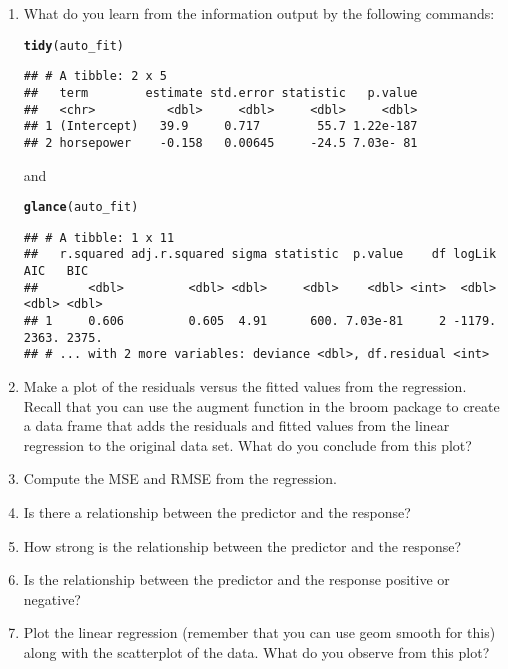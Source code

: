 \documentclass[12pt]{article}\usepackage[]{graphicx}\usepackage[]{color}
\makeatletter
\newcommand{\hlstd}[1]{\textcolor[rgb]{0.345,0.345,0.345}{#1}}%
\newcommand{\hlkwd}[1]{\textcolor[rgb]{0.737,0.353,0.396}{\textbf{#1}}}%
\newenvironment{kframe}{%
 \def\at@end@of@kframe{}%
 \ifinner\ifhmode%
  \def\at@end@of@kframe{\end{minipage}}%
  \begin{minipage}{\columnwidth}%
 \fi\fi%
 \def\FrameCommand##1{\hskip\@totalleftmargin \hskip-\fboxsep
 \colorbox{shadecolor}{##1}\hskip-\fboxsep
     \hskip-\linewidth \hskip-\@totalleftmargin \hskip\columnwidth}%
 \MakeFramed {\advance\hsize-\width
   \@totalleftmargin\z@ \linewidth\hsize
   \@setminipage}}%
 {\par\unskip\endMakeFramed%
 \at@end@of@kframe}
\newenvironment{knitrout}{}{} %
\makeatother
\begin{document}
\begin{enumerate}
\begin{enumerate}
\begin{knitrout}
\begin{kframe}
\end{kframe}
\end{knitrout}
      \item What do you learn from the information output by the following commands:
\begin{knitrout}
\color{fgcolor}\begin{kframe}
\begin{alltt}
 \hlkwd{tidy}\hlstd{(auto_fit)}
\end{alltt}
\begin{verbatim}
## # A tibble: 2 x 5
##   term        estimate std.error statistic   p.value
##   <chr>          <dbl>     <dbl>     <dbl>     <dbl>
## 1 (Intercept)   39.9     0.717        55.7 1.22e-187
## 2 horsepower    -0.158   0.00645     -24.5 7.03e- 81
\end{verbatim}
\end{kframe}
\end{knitrout}
      and
\begin{knitrout}
\color{fgcolor}\begin{kframe}
\begin{alltt}
 \hlkwd{glance}\hlstd{(auto_fit)}
\end{alltt}
\begin{verbatim}
## # A tibble: 1 x 11
##   r.squared adj.r.squared sigma statistic  p.value    df logLik   AIC   BIC
##       <dbl>         <dbl> <dbl>     <dbl>    <dbl> <int>  <dbl> <dbl> <dbl>
## 1     0.606         0.605  4.91      600. 7.03e-81     2 -1179. 2363. 2375.
## # ... with 2 more variables: deviance <dbl>, df.residual <int>
\end{verbatim}
\end{kframe}
\end{knitrout}
      
      \item Make a plot of the residuals versus the fitted values from the regression. Recall that you can use the augment function in the broom package to create a data frame that adds the residuals and fitted values from the linear regression to the original data set. What do you conclude from this plot?  
      \item Compute the MSE and RMSE from the regression. 
      \item Is there a relationship between the predictor and the response? 
      \item How strong is the relationship between the predictor and the response? 
      \item Is the relationship between the predictor and the response positive or negative? 
      \item Plot the linear regression (remember that you can use geom smooth for this) along with the scatterplot of the data. What do you observe from this plot?  
    \end{enumerate}
    

\end{enumerate}
\end{document}
